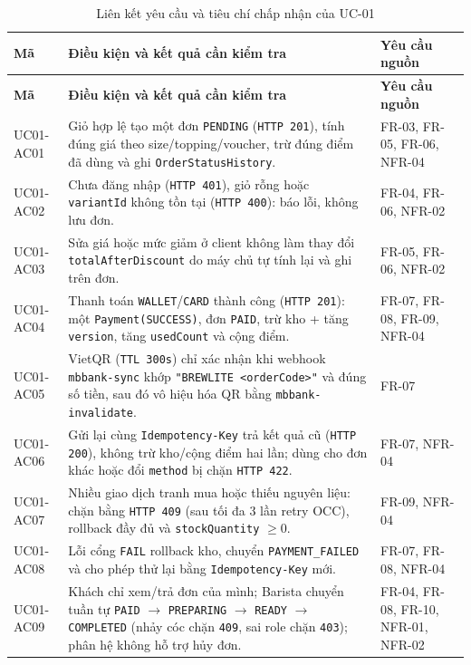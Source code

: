 \documentclass[12pt,a4paper]{report}
\begin{document}
\begin{longtable}{>{\raggedright\arraybackslash}p{2.2cm}>{\raggedright\arraybackslash}p{9.8cm}>{\raggedright\arraybackslash}p{3.0cm}}
\caption{Liên kết yêu cầu và tiêu chí chấp nhận của UC-01}\label{tab:uc01-ac}\\
\toprule
\textbf{Mã} & \textbf{Điều kiện và kết quả cần kiểm tra} & \textbf{Yêu cầu nguồn} \\
\midrule
\endfirsthead
\toprule
\textbf{Mã} & \textbf{Điều kiện và kết quả cần kiểm tra} & \textbf{Yêu cầu nguồn} \\
\midrule
\endhead
UC01-AC01 & Giỏ hợp lệ tạo một đơn \texttt{PENDING} (\texttt{HTTP 201}), tính đúng giá theo size/topping/voucher, trừ đúng điểm đã dùng và ghi \texttt{OrderStatusHistory}. & FR-03, FR-05, FR-06, NFR-04 \\
UC01-AC02 & Chưa đăng nhập (\texttt{HTTP 401}), giỏ rỗng hoặc \texttt{variantId} không tồn tại (\texttt{HTTP 400}): báo lỗi, không lưu đơn. & FR-04, FR-06, NFR-02 \\
UC01-AC03 & Sửa giá hoặc mức giảm ở client không làm thay đổi \texttt{totalAfterDiscount} do máy chủ tự tính lại và ghi trên đơn. & FR-05, FR-06, NFR-02 \\
UC01-AC04 & Thanh toán \texttt{WALLET}/\texttt{CARD} thành công (\texttt{HTTP 201}): một \texttt{Payment(SUCCESS)}, đơn \texttt{PAID}, trừ kho + tăng \texttt{version}, tăng \texttt{usedCount} và cộng điểm. & FR-07, FR-08, FR-09, NFR-04 \\
UC01-AC05 & VietQR (\texttt{TTL 300s}) chỉ xác nhận khi webhook \texttt{mbbank-sync} khớp \texttt{"BREWLITE <orderCode>"} và đúng số tiền, sau đó vô hiệu hóa QR bằng \texttt{mbbank-invalidate}. & FR-07 \\
UC01-AC06 & Gửi lại cùng \texttt{Idempotency-Key} trả kết quả cũ (\texttt{HTTP 200}), không trừ kho/cộng điểm hai lần; dùng cho đơn khác hoặc đổi \texttt{method} bị chặn \texttt{HTTP 422}. & FR-07, NFR-04 \\
UC01-AC07 & Nhiều giao dịch tranh mua hoặc thiếu nguyên liệu: chặn bằng \texttt{HTTP 409} (sau tối đa 3 lần retry OCC), rollback đầy đủ và \texttt{stockQuantity} $\ge 0$. & FR-09, NFR-04 \\
UC01-AC08 & Lỗi cổng \texttt{FAIL} rollback kho, chuyển \texttt{PAYMENT\_FAILED} và cho phép thử lại bằng \texttt{Idempotency-Key} mới. & FR-07, FR-08, NFR-04 \\
UC01-AC09 & Khách chỉ xem/trả đơn của mình; Barista chuyển tuần tự \texttt{PAID} $\rightarrow$ \texttt{PREPARING} $\rightarrow$ \texttt{READY} $\rightarrow$ \texttt{COMPLETED} (nhảy cóc chặn \texttt{409}, sai role chặn \texttt{403}); phân hệ không hỗ trợ hủy đơn. & FR-04, FR-08, FR-10, NFR-01, NFR-02 \\
\bottomrule
\end{longtable}
\end{document}
